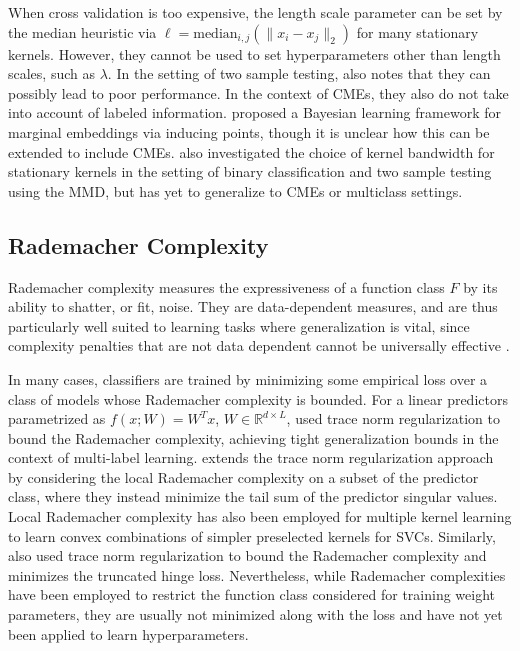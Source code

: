 \documentclass[twoside]{article}
\begin{document}
			When cross validation is too expensive, the length scale parameter can be set by the median heuristic \citep{muandet2016kernel} via $\ell = \mathrm{median}_{i, j}(\| x_{i} - x_{j} \|_{2})$ for many stationary kernels. However, they cannot be used to set hyperparameters other than length scales, such as $\lambda$. In the setting of two sample testing, \cite{gretton2012optimal} also notes that they can possibly lead to poor performance. In the context of \glspl{CME}, they also do not take into account of labeled information. \cite{flaxman2016bayesian} proposed a Bayesian learning framework for marginal embeddings via inducing points, though it is unclear how this can be extended to include \glspl{CME}. \cite{fukumizu2009kernel} also investigated the choice of kernel bandwidth for stationary kernels in the setting of binary classification and two sample testing using the \gls{MMD}, but has yet to generalize to \glspl{CME} or multiclass settings.

		\subsection{Rademacher Complexity}
		
			Rademacher complexity \citep{bartlett2002rademacher} measures the expressiveness of a function class $F$ by its ability to shatter, or fit, noise. They are data-dependent measures, and are thus particularly well suited to learning tasks where generalization is vital, since complexity penalties that are not data dependent cannot be universally effective \citep{kearns1997experimental}. 
	
			In many cases, classifiers are trained by minimizing some empirical loss over a class of models whose Rademacher complexity is bounded. For a linear predictors parametrized as $f(x; W) = W^{T} x$, $W \in \mathbb{R}^{d \times L}$, \cite{yu2014large} used trace norm regularization to bound the Rademacher complexity, achieving tight generalization bounds in the context of multi-label learning. \cite{xu2016local} extends the trace norm regularization approach by considering the local Rademacher complexity on a subset of the predictor class, where they instead minimize the tail sum of the predictor singular values. Local Rademacher complexity has also been employed for multiple kernel learning \citep{kloft2011local, cortes2013learning} to learn convex combinations of simpler preselected kernels for \glspl{SVC}. Similarly, \cite{pontil2013excess} also used trace norm regularization to bound the Rademacher complexity and minimizes the truncated hinge loss. Nevertheless, while Rademacher complexities have been employed to restrict the function class considered for training weight parameters, they are usually not minimized along with the loss and have not yet been applied to learn hyperparameters.
	
\end{document}
